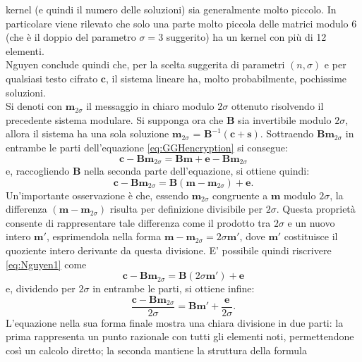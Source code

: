 kernel (e quindi il numero delle soluzioni) sia generalmente molto piccolo. In particolare
viene rilevato che solo una parte molto piccola delle matrici modulo 6 (che è il doppio del 
parametro $\sigma = 3$ suggerito) ha un kernel con più di 12 elementi. \\
Nguyen conclude quindi che, per la scelta suggerita di parametri $(n, \sigma)$ e per qualsiasi 
testo cifrato $\mathbf{c}$, il sistema lineare ha, molto probabilmente, pochissime soluzioni. \\
Si denoti con $\mathbf{m}_{2\sigma}$ il messaggio in chiaro modulo $2\sigma$ ottenuto 
risolvendo il precedente sistema modulare. Si supponga ora che $\mathbf{B}$ sia invertibile
modulo $2\sigma$, allora il sistema ha una sola soluzione 
$\mathbf{m}_{2\sigma}$ = $\mathbf{B}^{-1}(\mathbf{c} + \mathbf{s})$. Sottraendo $\mathbf{B}\mathbf{m}_{2\sigma}$ 
in entrambe le parti dell'equazione \ref{eq:GGHencryption} si consegue:
\[
    \mathbf{c} - \mathbf{B}\mathbf{m}_{2\sigma} = \mathbf{B}\mathbf{m} + \mathbf{e} - \mathbf{B}\mathbf{m}_{2\sigma}
\]
e, raccogliendo $\mathbf{B}$ nella seconda parte dell'equazione, si ottiene quindi:
\begin{equation}
    \label{eq:Nguyen1}
    \mathbf{c} - \mathbf{B}\mathbf{m}_{2\sigma} = \mathbf{B}(\mathbf{m} - \mathbf{m}_{2\sigma}) + \mathbf{e}.
\end{equation}
Un'importante osservazione è che, essendo $\mathbf{m}_{2\sigma}$ congruente a $\mathbf{m}$ 
modulo $2\sigma$, la differenza $(\mathbf{m} - \mathbf{m}_{2\sigma})$ risulta per definizione 
divisibile per $2\sigma$. Questa proprietà consente di rappresentare tale differenza 
come il prodotto tra $2\sigma$ e un nuovo intero $\mathbf{m}'$, esprimendola nella 
forma $\mathbf{m} - \mathbf{m}_{2\sigma} = 2\sigma\mathbf{m}'$, dove $\mathbf{m}'$ 
costituisce il quoziente intero derivante da questa divisione. E' possibile quindi riscrivere
\ref{eq:Nguyen1} come
\[
    \mathbf{c} - \mathbf{B}\mathbf{m}_{2\sigma} = \mathbf{B}(2\sigma\mathbf{m}') + \mathbf{e}
\]
e, dividendo per $2\sigma$ in entrambe le parti, si ottiene infine:
\begin{equation}
    \label{eq:Nguyen2}
    \frac{\mathbf{c} - \mathbf{B}\mathbf{m}_{2\sigma}}{2\sigma} = \mathbf{B}\mathbf{m}' + \frac{\mathbf{e}}{2\sigma}. 
\end{equation}
L'equazione  nella sua forma finale mostra una chiara divisione in due 
parti: la prima rappresenta un punto razionale con tutti gli elementi noti, 
permettendone così un calcolo diretto; la seconda mantiene la struttura della formula 

